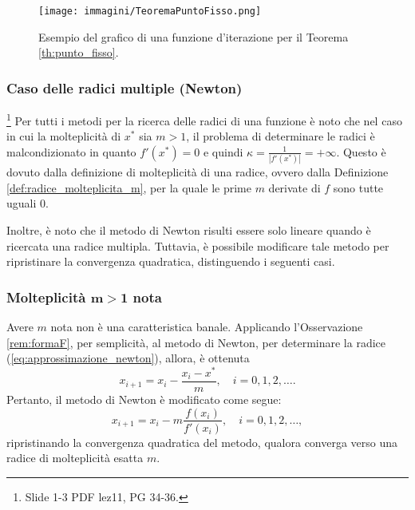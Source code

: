 \addtocounter{footnote}{-1}



\begin{figure}
	\centering
	\texttt{[image: immagini/TeoremaPuntoFisso.png]}
	\caption{\label{fig:TeoremaPuntoFisso}Esempio del grafico di una funzione d'iterazione per il Teorema \ref{th:punto_fisso}.}
\end{figure}

\subsubsection{Caso delle radici multiple (Newton)}
\footnote{Slide 1-3 PDF lez11, PG 34-36.}
Per tutti i metodi per la ricerca delle radici di una funzione è noto che nel caso in cui la molteplicità di $x^*$ sia $m>1$, il problema di determinare le radici è malcondizionato in quanto $f'(x^*) = 0$ e quindi $\kappa = \frac{1}{|f'(x^*)|}=+\infty$. Questo è dovuto dalla definizione di molteplicità di una radice, ovvero dalla Definizione \ref{def:radice_molteplicita_m}, per la quale le prime $m$ derivate di $f$ sono tutte uguali 0.

Inoltre, è noto che il metodo di Newton risulti essere solo lineare quando è ricercata una radice multipla. Tuttavia, è possibile modificare tale metodo per ripristinare la convergenza quadratica, distinguendo i seguenti casi.

\subsubsection{Molteplicità \texorpdfstring{$\boldsymbol{m>1}$}{m>1} nota}
Avere $m$ nota non è una caratteristica banale. Applicando l'Osservazione \ref{rem:formaF}, per semplicità, al metodo di Newton, per determinare la radice (\ref{eq:approssimazione_newton}), allora, è ottenuta
\begin{equation*}
	x_{i+1}=x_i-\frac{x_i-x^*}{m}, \quad i=0,1,2,\hdots.
\end{equation*}
Pertanto, il metodo di Newton è modificato come segue:
\begin{equation}\label{eq:approxNewtonMod}
	x_{i+1}=x_i-m\frac{f(x_i)}{f'(x_i)}, \quad i=0,1,2,\hdots,
\end{equation}
ripristinando la convergenza quadratica del metodo, qualora converga verso una radice di molteplicità esatta $m$.

